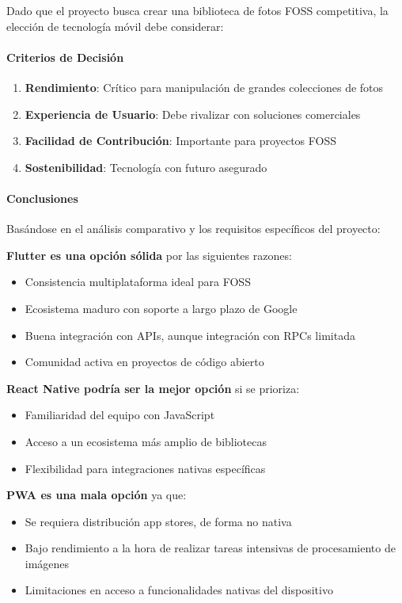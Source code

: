 Dado que el proyecto busca crear una biblioteca de fotos FOSS competitiva, la elección de tecnología móvil debe considerar:

\paragraph{Criterios de Decisión}
\begin{enumerate}
    \item \textbf{Rendimiento}: Crítico para manipulación de grandes colecciones de fotos
    \item \textbf{Experiencia de Usuario}: Debe rivalizar con soluciones comerciales
    \item \textbf{Facilidad de Contribución}: Importante para proyectos FOSS
    \item \textbf{Sostenibilidad}: Tecnología con futuro asegurado
\end{enumerate}

\paragraph{Conclusiones}
Basándose en el análisis comparativo y los requisitos específicos del proyecto:

\textbf{Flutter es una opción sólida} por las siguientes razones:
\begin{itemize}
    \item Consistencia multiplataforma ideal para FOSS
    \item Ecosistema maduro con soporte a largo plazo de Google
    \item Buena integración con APIs, aunque integración con RPCs limitada
    \item Comunidad activa en proyectos de código abierto
\end{itemize}

\textbf{React Native podría ser la mejor opción} si se prioriza:
\begin{itemize}
    \item Familiaridad del equipo con JavaScript
    \item Acceso a un ecosistema más amplio de bibliotecas
    \item Flexibilidad para integraciones nativas específicas
\end{itemize}

\textbf{PWA es una mala opción} ya que:
\begin{itemize}
    \item Se requiera distribución app stores, de forma no nativa
    \item Bajo rendimiento a la hora de realizar tareas intensivas de procesamiento de imágenes
    \item Limitaciones en acceso a funcionalidades nativas del dispositivo
\end{itemize}

